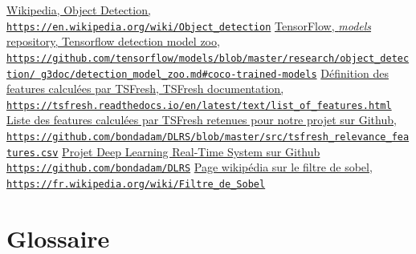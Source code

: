 \documentclass[french]{article}
\theoremstyle{mytheoremstyle}
\theoremstyle{mytheoremstyle}
\theoremstyle{myproblemstyle}
\begin{document}
\renewcommand\refname{7\indent Références}
\begin{thebibliography}{1}
 \href{https://en.wikipedia.org/wiki/Object\_detection}{Wikipedia, Object Detection, \texttt{https://en.wikipedia.org/wiki/Object\_detection}}
 \href{https://github.com/tensorflow/models/blob/master/research/object\_detection/g3doc/detection\_model\_zoo.md\#coco-trained-models}{TensorFlow, \textit{models} repository, Tensorflow detection model zoo, \texttt{https://github.com/tensorflow/models/blob/master/research/object\_detection/ \linebreak g3doc/detection\_model\_zoo.md\#coco-trained-models}}
 \href{https://tsfresh.readthedocs.io/en/latest/text/list\_of\_features.html}{Définition des features calculées par TSFresh, TSFresh documentation, \texttt{https://tsfresh.readthedocs.io/en/latest/text/list\_of\_features.html}}
 \href{https://github.com/bondadam/DLRS/blob/master/src/tsfresh\_relevance\_features.csv}{Liste des features calculées par TSFresh retenues pour notre projet sur Github, \texttt{https://github.com/bondadam/DLRS/blob/master/src/tsfresh\_relevance\_features.csv}}
 \href{https://github.com/bondadam/DLRS}{Projet Deep Learning Real-Time System sur Github \texttt{https://github.com/bondadam/DLRS}}
 \href{https://fr.wikipedia.org/wiki/Filtre\_de\_Sobel}{Page wikipédia sur le filtre de sobel, \texttt{https://fr.wikipedia.org/wiki/Filtre\_de\_Sobel}}
\end{thebibliography}
\clearpage

\section*{Glossaire}
\end{document}
